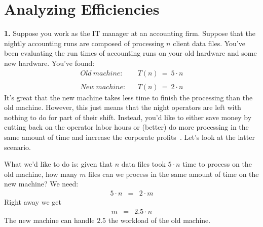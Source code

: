 
{\chapter{Analyzing Efficiencies}}



{\bf{1.}} Suppose you work as the IT manager at an accounting firm.
Suppose that the nightly accounting runs are composed of processing
$n$ client data files. You've been evaluating the run times of
accounting runs on your old hardware and some new hardware. You've
found:
\begin{eqnarray*}
{\mathit{Old\ machine:}} & & T(n) \ = \ 5{\cdot}n \\
& & \\
{\mathit{New\ machine:}} & & T(n) \ = \ 2{\cdot}n
\end{eqnarray*}
It's great that the new machine takes less time to finish
the processing than the old machine. However, this just means that
the night operators are left with nothing to do for part of their shift.
Instead, you'd like to either save money by cutting back on the operator
labor hours or (better) do more processing in the same amount of time
and increase the corporate
%
profits~\cite{techreport-full}.
Let's look at the latter scenario.

What we'd like to do is: given that $n$ data files took $5{\cdot}n$
time to process on the old machine, how many $m$ files can we process
in the same amount of time on the new machine? We need:
\begin{eqnarray*}
5{\cdot}n & = & 2{\cdot}m
\end{eqnarray*}
Right away we get
\begin{eqnarray*}
m & = & 2.5{\cdot}n
\end{eqnarray*}
The new machine can handle $2.5$ the workload of the old machine.




\vspace*{2em}

